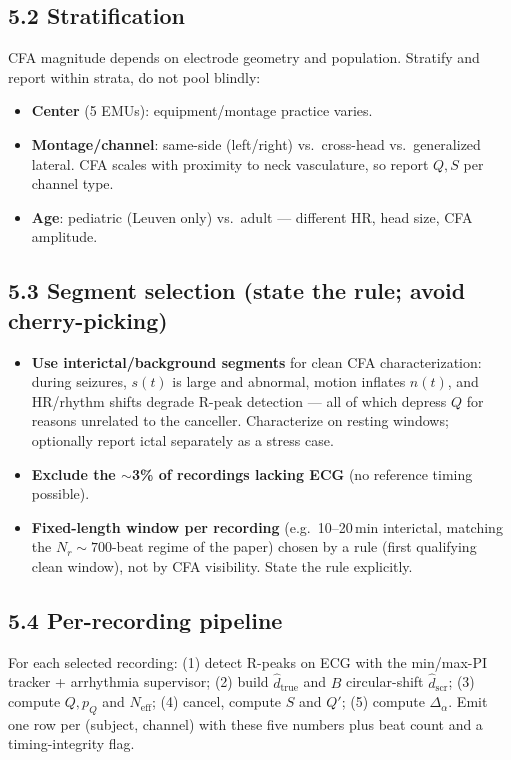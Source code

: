 \documentclass[11pt]{article}
\newcommand{\true}{\mathrm{true}}
\newcommand{\scr}{\mathrm{scr}}
\newcommand{\Neff}{N_{\mathrm{eff}}}
\newcommand{\dhat}{\widehat{d}}
\begin{document}
\subsection*{5.2 Stratification}
CFA magnitude depends on electrode geometry and population. Stratify and report within strata, do
not pool blindly:
\begin{itemize}[leftmargin=1.4em,itemsep=2pt]
\item \textbf{Center} (5 EMUs): equipment/montage practice varies.
\item \textbf{Montage/channel}: same-side (left/right) vs.\ cross-head vs.\ generalized lateral.
CFA scales with proximity to neck vasculature, so report $Q,S$ per channel type.
\item \textbf{Age}: pediatric (Leuven only) vs.\ adult --- different HR, head size, CFA amplitude.
\end{itemize}

\subsection*{5.3 Segment selection (state the rule; avoid cherry-picking)}
\begin{itemize}[leftmargin=1.4em,itemsep=2pt]
\item \textbf{Use interictal/background segments} for clean CFA characterization: during seizures,
$s(t)$ is large and abnormal, motion inflates $n(t)$, and HR/rhythm shifts degrade R-peak
detection --- all of which depress $Q$ for reasons unrelated to the canceller. Characterize on
resting windows; optionally report ictal separately as a stress case.
\item \textbf{Exclude the $\sim$3\% of recordings lacking ECG} (no reference timing possible).
\item \textbf{Fixed-length window per recording} (e.g.\ 10--20\,min interictal, matching the
$N_r\!\sim\!700$-beat regime of the paper) chosen by a rule (first qualifying clean window), not
by CFA visibility. State the rule explicitly.
\end{itemize}

\subsection*{5.4 Per-recording pipeline}
For each selected recording: (1) detect R-peaks on ECG with the min/max-PI tracker + arrhythmia
supervisor; (2) build $\dhat_\true$ and $B$ circular-shift $\dhat_\scr$; (3) compute $Q, p_Q$ and
$\Neff$; (4) cancel, compute $S$ and $Q'$; (5) compute $\Delta_\alpha$. Emit one row per
(subject, channel) with these five numbers plus beat count and a timing-integrity flag.
\end{document}
